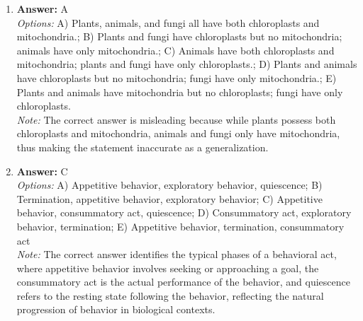 \documentclass[12pt]{article}
\begin{document}
\begin{enumerate}[label=\arabic*.]
\item \textbf{Answer:} A
\\ \textit{Options:} A) Plants, animals, and fungi all have both chloroplasts and mitochondria.; B) Plants and fungi have chloroplasts but no mitochondria; animals have only mitochondria.; C) Animals have both chloroplasts and mitochondria; plants and fungi have only chloroplasts.; D) Plants and animals have chloroplasts but no mitochondria; fungi have only mitochondria.; E) Plants and animals have mitochondria but no chloroplasts; fungi have only chloroplasts.
\\ \textit{Note:} The correct answer is misleading because while plants possess both chloroplasts and mitochondria, animals and fungi only have mitochondria, thus making the statement inaccurate as a generalization.
\item \textbf{Answer:} C
\\ \textit{Options:} A) Appetitive behavior, exploratory behavior, quiescence; B) Termination, appetitive behavior, exploratory behavior; C) Appetitive behavior, consummatory act, quiescence; D) Consummatory act, exploratory behavior, termination; E) Appetitive behavior, termination, consummatory act
\\ \textit{Note:} The correct answer identifies the typical phases of a behavioral act, where appetitive behavior involves seeking or approaching a goal, the consummatory act is the actual performance of the behavior, and quiescence refers to the resting state following the behavior, reflecting the natural progression of behavior in biological contexts.
\end{enumerate}
\end{document}
